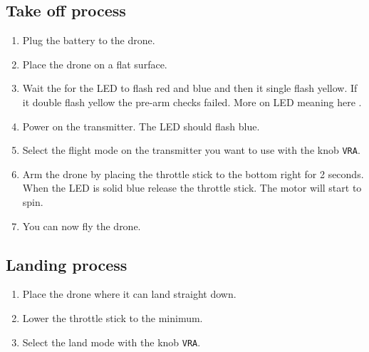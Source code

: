 \subsection{Take off process}
\begin{enumerate}
    \item Plug the battery to the drone.
    \item Place the drone on a flat surface.
    \item Wait the for the LED to flash red and blue and then it single flash yellow. If it double flash yellow the pre-arm checks failed. More on LED meaning here \cite{ardupilot_leds}.
    \item Power on the transmitter. The LED should flash blue.
    \item Select the flight mode on the transmitter you want to use with the knob \texttt{VRA}.
    \item Arm the drone by placing the throttle stick to the bottom right for 2 seconds. When the LED is solid blue release the throttle stick. The motor will start to spin.
    \item You can now fly the drone.
\end{enumerate}

\subsection{Landing process}
\begin{enumerate}
    \item Place the drone where it can land straight down.
    \item Lower the throttle stick to the minimum.
    \item Select the land mode with the knob \texttt{VRA}.
\end{enumerate}
